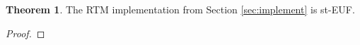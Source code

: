 \documentclass[12pt,english,oneside]{mrl}
\theoremstyle{definition}
\newtheorem{thm}[lem]{Theorem}
\numberwithin{equation}{section}
\numberwithin{figure}{section}
\numberwithin{equation}{section}
\numberwithin{equation}{section}
\numberwithin{figure}{section}
\begin{document}
 \begin{thm} The RTM implementation from Section \ref{sec:implement} is st-EUF.
 \end{thm}
 \begin{proof}
 \end{proof}



\end{document}
